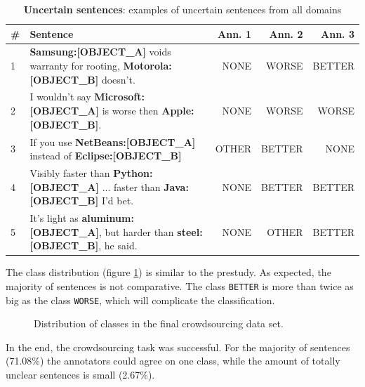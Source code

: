 \begin{table}[h]
\centering
\caption{\textbf{Uncertain sentences}: examples of uncertain sentences from all domains}
\label{tbl:all_res}
\begin{tabularx}{\textwidth}{lXrrr}
\toprule
\# & Sentence        & Ann. 1  & Ann. 2 & Ann. 3             \\ \midrule
1 & \textbf{{\color[HTML]{9A14B2}Samsung:{[}OBJECT\_A{]}}} voids warranty for rooting, \textbf{{\color[HTML]{6CB219}Motorola:{[}OBJECT\_B{]}}} doesn't. & NONE & WORSE & BETTER\\
2 & I wouldn't say \textbf{{\color[HTML]{9A14B2}Microsoft:{[}OBJECT\_A{]}}} is worse then \textbf{{\color[HTML]{6CB219}Apple:{[}OBJECT\_B{]}}}. & NONE & WORSE & WORSE\\

3 & If you use \textbf{{\color[HTML]{9A14B2}NetBeans:{[}OBJECT\_A{]}}} instead of \textbf{{\color[HTML]{6CB219}Eclipse:{[}OBJECT\_B{]}}} & OTHER & BETTER & NONE \\
4 & Visibly faster than \textbf{{\color[HTML]{9A14B2}Python:{[}OBJECT\_A{]}}} ... faster than \textbf{{\color[HTML]{6CB219}Java:{[}OBJECT\_B{]}}} I'd bet. & NONE & BETTER & BETTER \\
5 & It's light as \textbf{{\color[HTML]{9A14B2}aluminum:{[}OBJECT\_A{]}}}, but harder than \textbf{{\color[HTML]{6CB219}steel:{[}OBJECT\_B{]}}}, he said. & NONE & OTHER & BETTER\\
\bottomrule                              
\end{tabularx}
\end{table}


The class distribution (figure \ref{fig:all_fin}) is similar to the prestudy. As expected, the majority of sentences is not comparative. 
The class \texttt{BETTER} is more than twice as big as the class \texttt{WORSE}, which will complicate the classification.
\begin{figure}[h]
\centering
\caption{Distribution of classes in the final crowdsourcing data set.}
\label{fig:all_fin}
\end{figure}

In the end, the crowdsourcing task was successful. For the majority of sentences (71.08\%) the annotators could agree on one class, while the amount of totally unclear sentences is small (2.67\%).